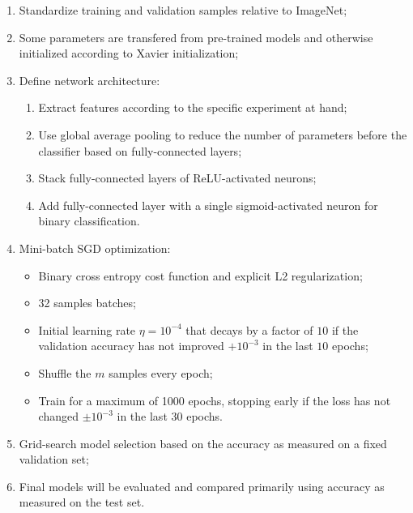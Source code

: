 \begin{enumerate}
    \item Standardize training and validation samples relative to ImageNet;
    \item Some parameters are transfered from pre-trained models and otherwise initialized according to Xavier initialization;
    \item Define network architecture:
        \begin{enumerate}
            \item Extract features according to the specific experiment at hand;
            \item Use global average pooling to reduce the number of parameters before the classifier based on fully-connected layers;
            \item Stack fully-connected layers of ReLU-activated neurons;
            \item Add fully-connected layer with a single sigmoid-activated neuron for binary classification.
        \end{enumerate}
    \item Mini-batch \ac{SGD} optimization:
        \begin{itemize}
            \item Binary cross entropy cost function and explicit L2 regularization;
            \item 32 samples batches;
            \item Initial learning rate $\eta = 10^{-4}$ that decays by a factor of $10$ if the validation accuracy has not improved $+10^{-3}$ in the last $10$ epochs;
            \item Shuffle the $m$ samples every epoch;
            \item Train for a maximum of 1000 epochs, stopping early if the loss has not changed $\pm 10^{-3}$ in the last $30$ epochs.
        \end{itemize}
    \item Grid-search model selection based on the accuracy as measured on a fixed validation set;
    \item Final models will be evaluated and compared primarily using accuracy as measured on the test set.
\end{enumerate}


